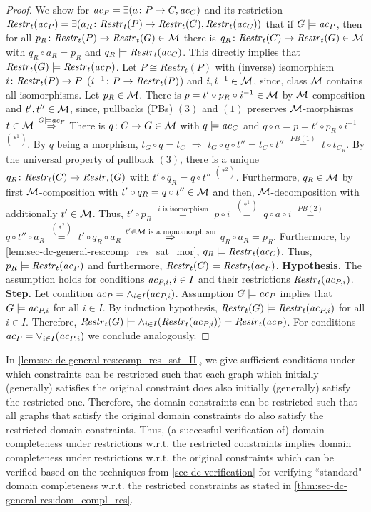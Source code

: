 \begin{proof}
We show for $\mathit{ac}_P=\exists(a\colon P \to C,\mathit{ac}_C)$ and its restriction $\mathit{Restr}_t(\mathit{ac}_P)=\exists(a_R\colon \mathit{Restr}_t(P) \to \mathit{Restr}_t(C),\mathit{Restr}_t(\mathit{ac}_C))$ that if $G \models \mathit{ac}_P$, then for all $p_R\colon \mathit{Restr}_t(P) \to \mathit{Restr}_t(G) \in {\cal M}$ there is $q_R\colon \mathit{Restr}_t(C) \to \mathit{Restr}_t(G) \in {\cal M}$ with $q_R \circ a_R=p_R$ and $q_R \models \mathit{Restr}_t(\mathit{ac}_C)$.
This directly implies that $\mathit{Restr}_t(G) \models \mathit{Restr}_t(\mathit{ac}_P)$.
Let $P \cong Restr_t(P)$ with (inverse) isomorphism $i\colon \mathit{Restr}_t(P) \to P$ ($i^{-1}\colon P \to \mathit{Restr}_t(P)$) and $i,i^{-1} \in {\cal M}$, since, class ${\cal M}$ contains all isomorphisms.
Let $p_R \in {\cal M}$.
There is $p=t' \circ p_R \circ i^{-1} \in {\cal M}$ by ${\cal M}$-composition and $t',t'' \in {\cal M}$, since, pullbacks (PBs) $(3)$ and $(1)$ preserves ${\cal M}$-morphisms $t \in {\cal M}$ $\stackrel{G \models \mathit{ac}_P}{\Rightarrow}$ There is $q\colon C \to G \in {\cal M}$ with $q \models \mathit{ac}_C$ and $q \circ a=p=t' \circ p_R \circ i^{-1}$ $^{(*^1)}$.
By $q$ being a morphism, $t_G \circ q=t_C$ $\Rightarrow$ $t_G \circ q \circ t''=t_C \circ t''$ $\stackrel{PB (1)}{=}$ $t \circ t_{C_R}$.
By the universal property of pullback $(3)$, there is a unique $q_R\colon \mathit{Restr}_t(C) \to \mathit{Restr}_t(G)$ with $t' \circ q_R=q \circ t''$ $^{(*^2)}$.
Furthermore, $q_R \in {\cal M}$ by first ${\cal M}$-composition with $t' \circ q_R=q \circ t'' \in {\cal M}$ and then, ${\cal M}$-decomposition with additionally $t' \in {\cal M}$.
Thus, $t' \circ p_R$ $\stackrel{i\text{ is isomorphism}}{=}$ $p \circ i$ $\stackrel{(*^1)}{=}$ $q \circ a \circ i$ $\stackrel{PB (2)}{=}$ $q \circ t'' \circ a_R$ $\stackrel{(*^2)}{=}$ $t' \circ q_R \circ a_R$ $\stackrel{t'\in{\cal M}\text{ is a monomorphism}}{\Rightarrow}$ $q_R \circ a_R=p_R$.
Furthermore, by \cref{lem:sec-dc-general-res:comp_res_sat_mor}, $q_R \models \mathit{Restr}_t(\mathit{ac}_C)$.
Thus, $p_R \models \mathit{Restr}_t(\mathit{ac}_P)$ and furthermore, $\mathit{Restr}_t(G) \models \mathit{Restr}_t(\mathit{ac}_P)$.
\textbf{Hypothesis.}
The assumption holds for conditions $\mathit{ac}_{P,i},i \in I$ and their restrictions $\mathit{Restr}_t(\mathit{ac}_{P,i})$.
\textbf{Step.}
Let condition $ac_P=\wedge_{i \in I}(\mathit{ac}_{P,i})$.
Assumption $G \models \mathit{ac}_P$ implies that $G \models \mathit{ac}_{P,i}$ for all $i \in I$.
By induction hypothesis, $\mathit{Restr}_t(G) \models \mathit{Restr}_t(\mathit{ac}_{P,i})$ for all $i \in I$.
Therefore, $\mathit{Restr}_t(G) \models \wedge_{i \in I}(\mathit{Restr}_t(\mathit{ac}_{P,i}))=\mathit{Restr}_t(\mathit{ac}_P)$.
For conditions $ac_P=\vee_{i \in I}(\mathit{ac}_{P,i})$ we conclude analogously.
\end{proof}

In \cref{lem:sec-dc-general-res:comp_res_sat_II}, we give  sufficient conditions under which constraints can be restricted such that each graph which initially (generally) satisfies the original constraint does also initially (generally) satisfy the restricted one.
Therefore, the domain constraints can be restricted such that all graphs that satisfy the original domain constraints do also satisfy the restricted domain constraints.
Thus, (a successful verification of) domain completeness under restrictions w.r.t. the restricted constraints implies domain completeness under restrictions w.r.t. the original constraints which can be verified based on the techniques from \cref{sec-dc-verification} for verifying ``standard" domain completeness w.r.t. the restricted constraints as stated in \cref{thm:sec-dc-general-res:dom_compl_res}.

